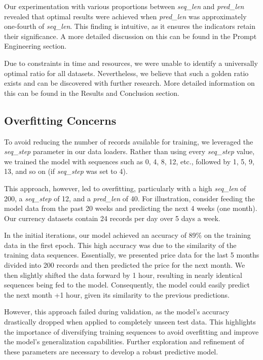 Our experimentation with various proportions between \textit{seq\_len} and \textit{pred\_len} revealed that optimal results were achieved when \textit{pred\_len} was approximately one-fourth of \textit{seq\_len}. This finding is intuitive, as it ensures the indicators retain their significance. A more detailed discussion on this can be found in the Prompt Engineering section.

Due to constraints in time and resources, we were unable to identify a universally optimal ratio for all datasets. Nevertheless, we believe that such a golden ratio exists and can be discovered with further research. More detailed information on this can be found in the Results and Conclusion section.

\subsection{Overfitting Concerns}
To avoid reducing the number of records available for training, we leveraged the \textit{seq\_step} parameter in our data loaders. Rather than using every \textit{seq\_step} value, we trained the model with sequences such as 0, 4, 8, 12, etc., followed by 1, 5, 9, 13, and so on (if \textit{seq\_step} was set to 4).

This approach, however, led to overfitting, particularly with a high \textit{seq\_len} of 200, a \textit{seq\_step} of 12, and a \textit{pred\_len} of 40. For illustration, consider feeding the model data from the past 20 weeks and predicting the next 4 weeks (one month). Our currency datasets contain 24 records per day over 5 days a week.

In the initial iterations, our model achieved an accuracy of 89\% on the training data in the first epoch. This high accuracy was due to the similarity of the training data sequences. Essentially, we presented price data for the last 5 months divided into 200 records and then predicted the price for the next month. We then slightly shifted the data forward by 1 hour, resulting in nearly identical sequences being fed to the model. Consequently, the model could easily predict the next month +1 hour, given its similarity to the previous predictions.

However, this approach failed during validation, as the model's accuracy drastically dropped when applied to completely unseen test data. This highlights the importance of diversifying training sequences to avoid overfitting and improve the model's generalization capabilities. Further exploration and refinement of these parameters are necessary to develop a robust predictive model.

